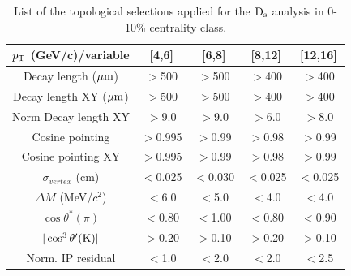 
\begin{table}[!h]
 \begin{center}
  \begin{tabular}{|c|c|c|c|c|}
\hline
$p_{\rm T}$ (GeV/c)/variable &  [4,6] & [6,8] & [8,12] & [12,16] \\
\hline
\hline
Decay length ($\mathrm{\mu m}$)        & $>$500 & $>$500 & $>$400 & $>$400\\
\hline
Decay length XY ($\mathrm{\mu m}$)     & $>$500 & $>$500 & $>$400 & $>$400\\
\hline
Norm Decay length XY          & $>$9.0 & $>$9.0 & $>$6.0 & $>$8.0\\
\hline
Cosine pointing              & $>$0.995 & $>$0.99 & $>$0.98 & $>$0.99\\
\hline
Cosine pointing XY        & $>$0.995 & $>$0.99 & $>$0.98 & $>$0.99\\
\hline
$\sigma_{vertex}$  (cm)          &  $<$0.025 & $<$0.030 & $<$0.025 & $<$0.025\\
\hline
$\Delta M$ (MeV/$c^{2}$) & $<$6.0 & $<$5.0 & $<$4.0 & $<$4.0\\
\hline
$\cos \theta^*(\pi)$    &$<$0.80 & $<$1.00 & $<$0.80 & $<$0.90\\
\hline
$|\cos^3 \theta^\prime({\rm K})|$        & $>$0.20 & $>$0.10 & $>$0.20 & $>$0.10\\
\hline
Norm. IP residual   & $<$1.0 & $<$2.0 & $<$2.0 & $<$2.5 \\
\hline
  \end{tabular}
 \caption{List of the topological selections applied for the
   ${\rm D_s}$ analysis in 0-10\% centrality class.}
 \label{tab:topologicalselections_ds_010}
 \end{center}
\end{table} 

